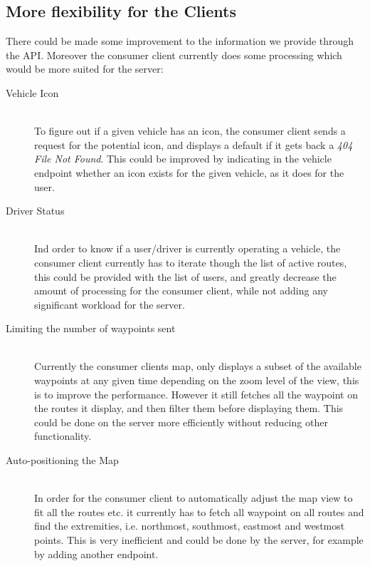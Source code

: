 \subsection{More flexibility for the Clients} 
There could be made some improvement to the information we provide through the API.
Moreover the consumer client currently does some processing which would be more suited for the server:
\begin{description}
    \item[Vehicle Icon] \hfill \\ 
    To figure out if a given vehicle has an icon, the consumer client sends a request for the potential icon, and displays a default if it gets back a \textit{404 File Not Found}. 
    This could be improved by indicating in the vehicle endpoint whether an icon exists for the given vehicle, as it does for the user. 
    \item[Driver Status] \hfill \\
    Ind order to know if a user/driver is currently operating a vehicle, the consumer client currently has to iterate though the list of active routes, this could be provided with the list of users, and greatly decrease the amount of processing for the consumer client, while not adding any significant workload for the server.
    \item[Limiting the number of waypoints sent] \hfill \\
    Currently the consumer clients map, only displays a subset of the available waypoints at any given time depending on the zoom level of the view, this is to improve the performance.
    However it still fetches all the waypoint on the routes it display, and then filter them before displaying them.
    This could be done on the server more efficiently without reducing other functionality.
    \item[Auto-positioning the Map] \hfill \\
    In order for the consumer client to automatically adjust the map view to fit all the routes etc. it currently has to fetch all waypoint on all routes and find the extremities, i.e. northmost, southmost, eastmost and westmost points. 
    This is very inefficient and could be done by the server, for example by adding another endpoint.
\end{description}

